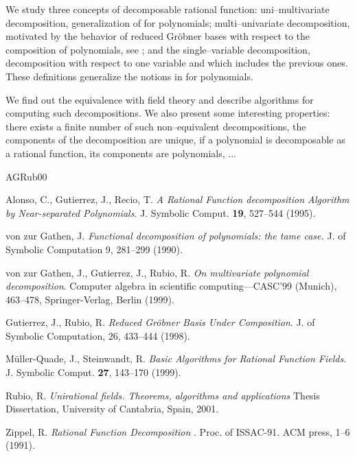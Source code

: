 \documentclass[12pt]{article}
\begin{document}
 We study three concepts of
   decomposable rational function: uni--multivariate
 decomposition, generalization of
   \cite{Gat90} for
polynomials;  multi--univariate decomposition, motivated by the behavior of
reduced Gr\"obner  bases with
respect to the composition of polynomials, see \cite{GRub98};
and the single--variable decomposition, decomposition with respect to one
variable and which
includes the previous ones. These definitions generalize the notions
in \cite{casc99} for polynomials.
\par


 We find out the equivalence
with field theory and describe algorithms for computing such decompositions.
We also present some interesting properties: there exists a  finite number of
such
non--equivalent decompositions, the components of the decomposition are unique,
if a polynomial is
decomposable as a rational function, its components are polynomials, ...
\medskip





\begin{thebibliography}{AGRub00}


 Alonso, C., Gutierrez, J., Recio, T.
\textsl{A Rational Function
decomposition Algorithm by Near-separated Polynomials}. J.  Symbolic
Comput. {\bf 19}, 527--544
(1995). \par


 von zur
Gathen, J.
\textsl{Functional
decomposition of
polynomials: the tame case.}  J. of Symbolic Computation 9,
281--299 (1990).\par

 von zur Gathen, J., Gutierrez, J., Rubio, R.
\textsl{On multivariate polynomial
decomposition}. Computer algebra in scientific computing---CASC'99
(Munich), 463--478,
Springer-Verlag, Berlin (1999).\par
{}
Gutierrez, J., Rubio, R.
\textsl{Reduced Gr\"obner
Basis Under Composition}.  J. of Symbolic Computation, 26,
433--444 (1998).\par

 M\"uller-Quade, J., Steinwandt, R.
\textsl{Basic Algorithms for Rational Function Fields}. J. Symbolic
Comput. {\bf 27},  143--170 (1999).\par

 Rubio, R. \textsl{Unirational fields. Theorems,
algorithms
and applications} Thesis Dissertation, University of Cantabria, Spain, 2001.\par


 Zippel, R.
\textsl{ Rational Function Decomposition }. Proc. of  ISSAC-91. ACM
press, 1--6 (1991).


\end{thebibliography}
\end{document}
